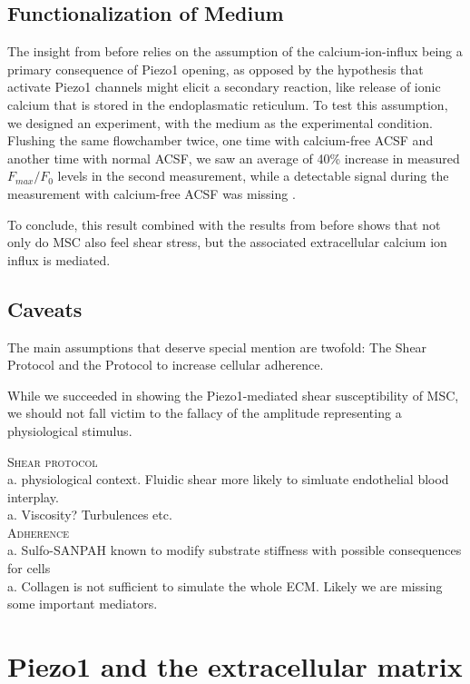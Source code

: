 \subsection{Functionalization of Medium}
The insight from before relies on the assumption of the calcium-ion-influx being a primary consequence of Piezo1 opening, as opposed by the hypothesis that activate Piezo1 channels might elicit a secondary reaction, like release of ionic calcium that is stored in the endoplasmatic reticulum. To test this assumption, we designed an experiment, with the medium as the experimental condition.\\
Flushing the same flowchamber twice, one time with calcium-free ACSF and another time with normal ACSF, we saw an average of 40\% increase in measured $F_{max}/F_{0}$ levels in the second measurement, while a detectable signal during the measurement with calcium-free ACSF was missing .\par

To conclude, this result combined with the results from before shows that not only do MSC also feel shear stress, but the associated extracellular calcium ion influx is \Piezo mediated. 

\subsection{Caveats}
The main assumptions that deserve special mention are twofold: The Shear Protocol and the Protocol to increase cellular adherence. \par
While we succeeded in showing the Piezo1-mediated shear susceptibility of MSC, we should not fall victim to the fallacy of the amplitude representing a physiological stimulus. 

\textsc{Shear protocol}\\
a. physiological context. Fluidic shear more likely to simluate endothelial blood interplay.\\
a. Viscosity? Turbulences etc.\\
\textsc{Adherence}\\
a. Sulfo-SANPAH known to modify substrate stiffness with possible consequences for cells\\
a. Collagen is not sufficient to simulate the whole ECM. Likely we are missing some important mediators.

\section{Piezo1 and the extracellular matrix}

